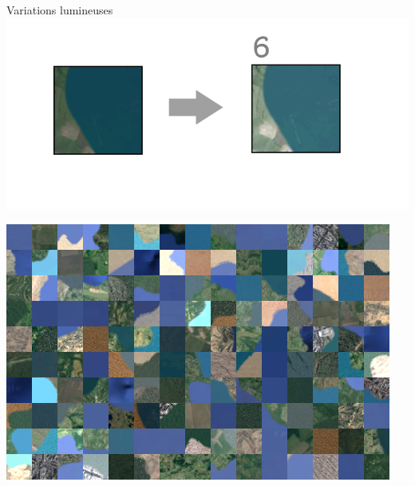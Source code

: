 \documentclass[ignorenonframetext,]{beamer}
\begin{document}
\begin{frame}{Variations lumineuses}
	\includegraphics{procede3.png}
\end{frame}

\begin{frame}{}
	\includegraphics{tableau.png}
\end{frame}
\end{document}
